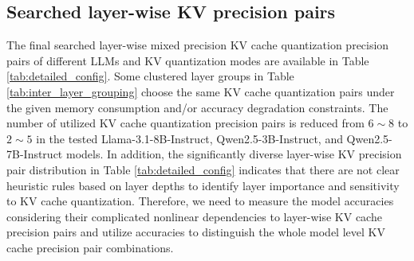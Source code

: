 \subsection{Searched layer-wise KV precision pairs}
The final searched layer-wise mixed precision KV cache quantization precision pairs of different LLMs and KV quantization modes are available in Table \ref{tab:detailed_config}. Some clustered layer groups in Table \ref{tab:inter_layer_grouping} choose the same KV cache quantization pairs under the given memory consumption and/or accuracy degradation constraints. The number of utilized KV cache quantization precision pairs is reduced from $6\sim8$ to $2\sim 5$ in the tested Llama-3.1-8B-Instruct, Qwen2.5-3B-Instruct, and Qwen2.5-7B-Instruct models. In addition, the significantly diverse layer-wise KV precision pair distribution in Table \ref{tab:detailed_config} indicates that there are not clear heuristic rules based on layer depths to identify layer importance and sensitivity to KV cache quantization. Therefore, we need to measure the model accuracies considering their complicated nonlinear dependencies to layer-wise KV cache precision pairs and utilize accuracies to distinguish the whole model level KV cache precision pair combinations.
